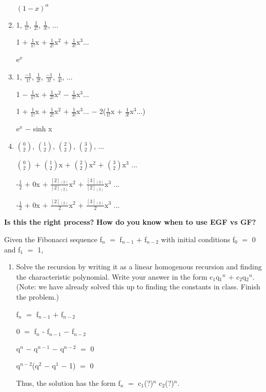 \documentclass{article}
\newcommand{\mt}[1]{\ensuremath{#1}}
\newcommand{\balist}{\begin{enumerate}[label=\alph*.]}
\newcommand{\elist}{\end{enumerate}}
\newcommand{\afa}{\mt{\alpha} }
\newcommand{\ps}{\mt{+} }
\newcommand{\ms}{\mt{-} }
\newcommand{\eql}{\mt{=} }
\newcommand{\uw}[2]{#1\mt{_{#2}}}
\newcommand{\uf}[2]{#1\mt{^{#2}}}
\newcommand{\frc}[2]{\mt{\frac{#1}{#2}}}
\newcommand{\nck}[2]{\mt{{#1 \choose #2}}}
\newcommand{\ff}[2]{[\mt{#1}]\mt{_{(\underline{#2})}}}
\begin{document}
\begin{enumerate}
   \mt{(1 - x)^\afa}
   
   \item 1, \frc{1}{1!}, \frc{1}{2!}, \frc{1}{3!}, ...
   
   1 \ps \frc{1}{1!}x \ps \frc{1}{2!}\uf{x}{2} \ps \frc{1}{3!}\uf{x}{3}...
   
   \uf{e}{x}
   
   \item 1, \frc{-1}{1!}, \frc{1}{2!}, \frc{-1}{3!}, \frc{1}{4!}, ...
   
   1 \ms \frc{1}{1!}x \ps \frc{1}{2!}\uf{x}{2} \ms \frc{1}{3!}\uf{x}{3}...
   
   1 \ps \frc{1}{1!}x \ps \frc{1}{2!}\uf{x}{2} \ps \frc{1}{3!}\uf{x}{3}... \ms 2(\frc{1}{1!}x \ps \frc{1}{3!}\uf{x}{3}...)
   
   \uf{e}{x} \ms sinh x
   
   \item \nck{0}{2}, \nck{1}{2}, \nck{2}{2}, \nck{3}{2}, ...
   
   \nck{0}{2} \ps \nck{1}{2}x \ps \nck{2}{2}\uf{x}{2} \ps \nck{3}{2}\uf{x}{3} ...
   
   -\frc{1}{2} \ps 0x \ps \frc{\ff{2}{2}}{\ff{2}{2}}\uf{x}{2} \ps \frc{\ff{3}{2}}{\ff{2}{2}}\uf{x}{3} ...
   
   -\frc{1}{2} \ps 0x \ps \frc{\ff{2}{2}}{2}\uf{x}{2} \ps \frc{\ff{3}{2}}{2}\uf{x}{3} ... 

   \elist
   
   \textbf{Is this the right process?} \textbf{How do you know when to use EGF vs GF?}
   \item Given the Fibonacci sequence \uw{f}{n} \eql \uw{f}{n - 1} \ps \uw{f}{n - 2} with initial conditions \uw{f}{0} \eql 0 and \uw{f}{1} \eql 1,
   \balist
   \item Solve the recursion by writing it as a linear homogenous recursion and finding the characteristic polynomial. Write your answer in the form \uw{c}{1}\uf{\uw{q}{1}}{n} \ps \uw{c}{2}\uf{\uw{q}{2}}{n}. (Note: we have already solved this up to finding the constants in class. Finish the problem.)
   
   \uw{f}{n} \eql \uw{f}{n - 1} \ps \uw{f}{n - 2}
   
   0 \eql \uw{f}{n} - \uw{f}{n - 1} \ms \uw{f}{n - 2}
   
   \uf{q}{n} \ms \uf{q}{n - 1} \ms \uf{q}{n - 2} \eql 0
   
   \uf{q}{n - 2}(\uf{q}{2} \ms \uf{q}{1} \ms 1) \eql 0
   
   Thus, the solution has the form \uw{f}{n} \eql \uw{c}{1}\uf{(?)}{n} \uw{c}{2}\uf{(?)}{n}.
   

\end{enumerate}
\end{document}
